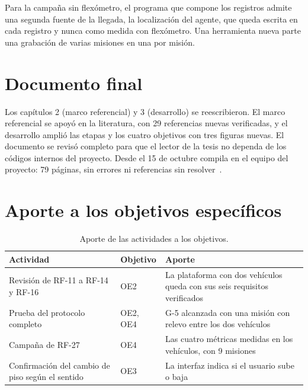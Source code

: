 \documentclass[12pt,letterpaper]{article}
\begin{document}
Para la campaña sin flexómetro, el programa que compone los registros admite una segunda fuente de la llegada, la localización del agente, que queda escrita en cada registro y nunca como medida con flexómetro. Una herramienta nueva parte una grabación de varias misiones en una por misión.

\section{Documento final}

Los capítulos 2 (marco referencial) y 3 (desarrollo) se reescribieron. El marco referencial se apoyó en la literatura, con 29 referencias nuevas verificadas, y el desarrollo amplió las etapas y los cuatro objetivos con tres figuras nuevas. El documento se revisó completo para que el lector de la tesis no dependa de los códigos internos del proyecto. Desde el 15 de octubre compila en el equipo del proyecto: 79 páginas, sin errores ni referencias sin resolver~\cite{estado}.

\section{Aporte a los objetivos específicos}

\begin{table}[H]
    \centering
    \small
    \caption{Aporte de las actividades a los objetivos.}
    \label{tab:aporte}
    \begin{tabular}{@{}p{4.2cm}p{3.6cm}p{6.2cm}@{}}
        \toprule
        \textbf{Actividad} & \textbf{Objetivo} & \textbf{Aporte} \\ \midrule
        Revisión de RF-11 a RF-14 y RF-16 & OE2 & La plataforma con dos vehículos queda con sus seis requisitos verificados \\ \addlinespace
        Prueba del protocolo completo & OE2, OE4 & G-5 alcanzada con una misión con relevo entre los dos vehículos \\ \addlinespace
        Campaña de RF-27 & OE4 & Las cuatro métricas medidas en los vehículos, con 9 misiones \\ \addlinespace
        Confirmación del cambio de piso según el sentido & OE3 & La interfaz indica si el usuario sube o baja \\ \bottomrule
    \end{tabular}
\end{table}
\end{document}
